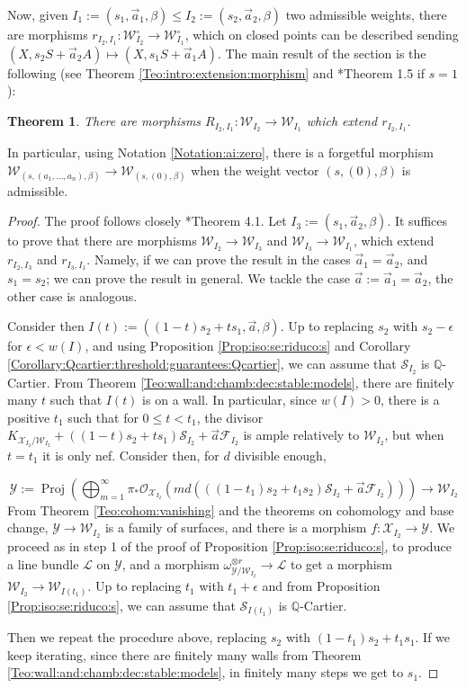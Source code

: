 \documentclass[11pt]{amsart}
\newcommand{\cE}{\mathcal{W}}
\newcommand{\sF}{\mathscr{F}}
\newcommand{\sL}{\mathscr{L}}
\newcommand{\sS}{\mathscr{S}}
\newcommand{\sX}{\mathscr{X}}
\newcommand{\cO}{\mathcal{O}}
\newcommand{\sY}{\mathscr{Y}}
\newtheorem{Teo}[theorem]{Theorem}
\theoremstyle{definition}
\begin{document}
Now, given $I_1:=(s_1,\vec{a}_1,\beta) \le I_2:=(s_2,\vec{a}_2,\beta)$
two admissible weights, there are morphisms $r_{I_2,I_1}:\cE_{I_2}^\circ \to \cE_{I_1}^\circ$,
which on closed points can be described sending $(X,s_2S+\vec{a}_2A)\mapsto (X,s_1S+\vec{a}_1A)$. 
The main result of the section is the following (see Theorem \ref{Teo:intro:extension:morphism} and \cite{AB3}*{Theorem 1.5} if $s=1$):
\begin{Teo}\label{Teo:wall:crossings:morphisms}
There are morphisms $R_{I_2,I_1}:\cE_{I_2}\to \cE_{I_1}$ which extend $r_{I_2,I_1}$.
\end{Teo}
In particular, using Notation \ref{Notation:ai:zero}, there is a forgetful morphism
$\cE_{(s,(a_1,...,a_n),\beta)} \to \cE_{(s,(0),\beta)}$ when the weight vector $(s,(0),\beta)$ is admissible.
\begin{proof}
The proof follows closely \cite{Hassett}*{Theorem 4.1}.
Let $I_3:=(s_1,\vec{a}_2,\beta)$.
It suffices to prove that there are morphisms $\cE_{I_2} \to \cE_{I_3}$ and $\cE_{I_3} \to \cE_{I_1}$, which
extend $r_{I_2,I_3}$ and $r_{I_3,I_1}$. Namely, if we can prove the result in the cases $\vec{a}_1=\vec{a}_2$, and $s_1=s_2$; we can prove the result
in general.
We tackle the case $\vec{a}:=\vec{a}_1=\vec{a}_2$, the other case is analogous.

Consider then $I(t):=((1-t)s_2 + ts_1,\vec{a},\beta)$.
Up to replacing $s_2$ with $s_2-\epsilon$ for $\epsilon <w(I)$,
and using Proposition \ref{Prop:iso:se:riduco:s} and Corollary \ref{Corollary:Qcartier:threshold:guarantees:Qcartier}, we can assume that $\sS_{I_2}$
is $\mathbb{Q}$-Cartier. From
Theorem \ref{Teo:wall:and:chamb:dec:stable:models}, there are finitely many $t$ such that $I(t)$ is on a wall. In particular, since
$w(I)>0$, there is a positive $t_1$ such that for
$0\le t<t_1$, the divisor $K_{\sX_{I_2}/\cE_{I_2}}+((1-t)s_2+ts_1)\sS_{I_2}+\vec{a}\sF_{I_2}$ is ample relatively to $\cE_{I_2}$, but when
$t=t_1$ it is only nef. Consider then, for $d$ divisible enough,

$$\sY:=\operatorname{Proj}(\bigoplus _{m=1}^\infty \pi_*\cO_{\sX_{I_2}}( md(((1-t_1)s_2+t_1s_2)\sS_{I_2}+\vec{a}\sF_{I_2}))) \to \cE_{I_2}$$
From Theorem \ref{Teo:cohom:vanishing} and the theorems on cohomology and base change, $\sY \to \cE_{I_2}$ is a family
of surfaces, and there is a morphism $f:\sX_{I_2} \to \sY$. We proceed as in step 1 of the proof of Proposition \ref{Prop:iso:se:riduco:s},
to produce a line bundle $\sL$ on $\sY$, and a morphism
$\omega_{\sY/\cE_{I_2}}^{\otimes r} \to \sL$ to get a morphism $\cE_{I_2} \to \cE_{I(t_1)}$. Up to replacing $t_1$ with $t_1+\epsilon$ and from Proposition
\ref{Prop:iso:se:riduco:s}, we can assume that $\sS_{I(t_1)}$ is $\mathbb{Q}$-Cartier.

Then we repeat the procedure above, replacing $s_2$ with $(1-t_1)s_2+t_1s_1$. If we keep iterating, since
there are finitely many walls from Theorem \ref{Teo:wall:and:chamb:dec:stable:models}, in finitely many steps we get to $s_1$.
\end{proof}
\end{document}
